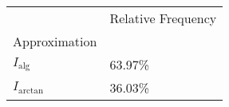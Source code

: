 \begin{tabular}{ll}
 & Relative Frequency \\
Approximation &  \\
$I_\text{alg}$ & 63.97\% \\
\cline{1-2}
$I_\text{arctan}$ & 36.03\% \\
\cline{1-2}
\end{tabular}
